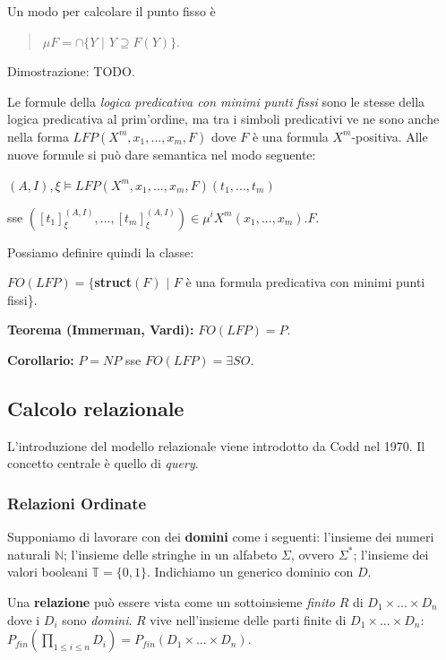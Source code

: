 \documentclass{article}
\begin{document}
\bigskip

Un modo per calcolare il punto fisso è 
\begin{quote}
$\mu F=\cap\{Y\,\,|\,\,Y\supseteq F(Y)\}$.
\end{quote}

Dimostrazione: TODO.

\bigskip

Le formule della \textit{logica predicativa con minimi punti fissi} sono le stesse della logica predicativa al prim'ordine, ma tra i simboli predicativi ve ne sono anche nella forma $LFP(X^m,x_1,...,x_m,F)$ dove $F$ è una formula $X^m$-positiva. Alle nuove formule si può dare semantica nel modo seguente:

$(A,I),\xi\vDash LFP(X^m,x_1,...,x_m,F)(t_1,...,t_m)$

sse $([t_1]_\xi^{(A,I)},...,[t_m]_\xi^{(A,I)})\in\mu^iX^m(x_1,...,x_m).F$.

\bigskip

\noindent Possiamo definire quindi la classe:

\noindent$FO(LFP)=\{$\textbf{struct}$(F)\,\,|\,\, F$ è una formula predicativa con minimi punti fissi\}.

\bigskip

\textbf{Teorema (Immerman, Vardi):} $FO(LFP)=P$.

\textbf{Corollario:} $P=NP$ sse $FO(LFP)=\exists SO$.

\subsection{Calcolo relazionale}
L'introduzione del modello relazionale viene introdotto da Codd nel 1970. Il concetto centrale è quello di \textit{query}.

\subsubsection{Relazioni Ordinate}
Supponiamo di lavorare con dei \textbf{domini} come i seguenti: l'insieme dei numeri naturali $\mathbb{N}$; l'insieme delle stringhe in un alfabeto $\Sigma$, ovvero $\Sigma^*$; l'insieme dei valori booleani $\mathbb{T}=\{0,1\}$. Indichiamo un generico dominio con $D$.

\bigskip

Una \textbf{relazione} può essere vista come un sottoinsieme \textit{finito} $R$ di $D_1\times...\times D_n$ dove i $D_i$ sono \textit{domini}. $R$ vive nell'insieme delle parti finite di $D_1\times...\times D_n$:
$P_{fin}(\prod_{1\leq i\leq n} D_i) = P_{fin}(D_1\times...\times D_n)$.
\end{document}
